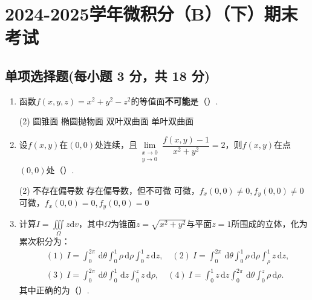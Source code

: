 \documentclass[../Main.tex]{subfiles}
\begin{document}
\chapter{2024-2025学年微积分（B）（下）期末考试}

\section{单项选择题(每小题 3 分，共 18 分)}
\begin{enumerate}
  \item 函数$f(x,y,z)=x^2+y^2-z^2$的等值面\textbf{不可能}是（\qquad）.

        \begin{tasks}[label=\textbf{\Alph*.}, label-width=1.5em, column-sep=1em](2)
          \task 圆锥面
          \task 椭圆抛物面
          \task 双叶双曲面
          \task 单叶双曲面
        \end{tasks}

  \item 设$f(x,y)$在$(0,0)$处连续，且$\lim\limits_{\substack{x \to 0 \\ y \to 0}}\dfrac{f(x,y)-1}{x^2+y^2}=2$，则$f(x,y)$在点$(0,0)$处（\qquad）.

        \begin{tasks}[label=\textbf{\Alph*.}, label-width=1.5em, column-sep=1em](2)
          \task 不存在偏导数
          \task 存在偏导数，但不可微
          \task 可微，$f_x(0,0)\neq 0,f_y(0,0)\neq 0$
          \task 可微，$f_x(0,0)=0,f_y(0,0)=0$
        \end{tasks}

  \item \begin{minipage}[t]{0.93\linewidth}
          计算$I=\displaystyle \iiint \limits_\Omega z \mathrm{d}v$，其中$\Omega$为锥面$z=\sqrt{x^2+y^2}$与平面$z=1$所围成的立体，化为累次积分为：
          \[
            \begin{aligned}
               & (1)\ I=\int_0^{2\pi}\,\mathrm{d}\theta\int_0^1\rho\,\mathrm{d}\rho\int_0^1z\,\mathrm{d}z,\quad
              (2)\ I=\int_0^{2\pi}\,\mathrm{d}\theta\int_0^1\rho\,\mathrm{d}\rho\int_\rho^1z\,\mathrm{d}z,      \\
               & (3)\ I=\int_0^{2\pi}\,\mathrm{d}\theta\int_0^1\,\mathrm{d}z\int_0^z z\,\mathrm{d}\rho,\quad
              (4)\ I=\int_0^1z\,\mathrm{d}z\int_0^{2\pi}\,\mathrm{d}\theta\int_0^z\rho\,\mathrm{d}\rho.
            \end{aligned}
          \]
          其中正确的为（\qquad）.


\end{minipage}
\end{enumerate}
\end{document}
